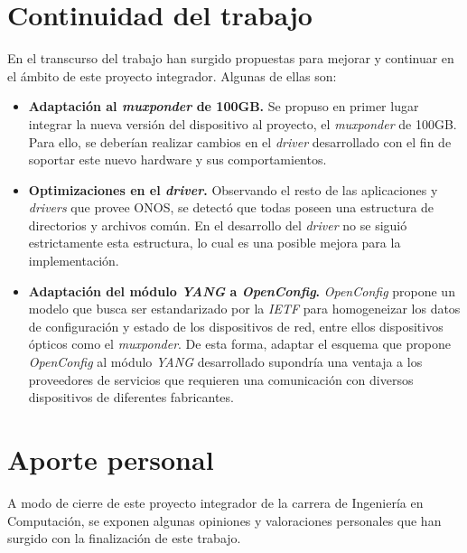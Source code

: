 \section{Continuidad del trabajo} %

En el transcurso del trabajo han surgido propuestas para mejorar y continuar en el ámbito de este proyecto integrador. Algunas de ellas son:

\begin{itemize}

    \item \textbf{Adaptación al \textit{muxponder} de 100GB.} Se propuso en primer lugar integrar la nueva versión del dispositivo al proyecto, el \textit{muxponder} de 100GB. Para ello, se deberían realizar cambios en el \textit{driver} desarrollado con el fin de soportar este nuevo hardware y sus comportamientos.

    
    \item \textbf{Optimizaciones en el \textit{driver}.} Observando el resto de las aplicaciones y \textit{drivers} que provee ONOS, se detectó que todas poseen una estructura de directorios y archivos común. En el desarrollo del \textit{driver} no se siguió estrictamente esta estructura, lo cual es una posible mejora para la implementación.

    \item \textbf{Adaptación del módulo \textit{YANG} a \textit{OpenConfig}.} \textit{OpenConfig} propone un modelo que busca ser estandarizado por la \textit{IETF} para homogeneizar los datos de configuración y estado de los dispositivos de red, entre ellos dispositivos ópticos como el \textit{muxponder}. De esta forma, adaptar el esquema que propone \textit{OpenConfig} al módulo \textit{YANG} desarrollado supondría una ventaja a los proveedores de servicios que requieren una comunicación con diversos dispositivos de diferentes fabricantes.

\end{itemize}

\section{Aporte personal}

A modo de cierre de este proyecto integrador de la carrera de Ingeniería en Computación, se exponen algunas opiniones y valoraciones personales que han surgido con la finalización de este trabajo.

